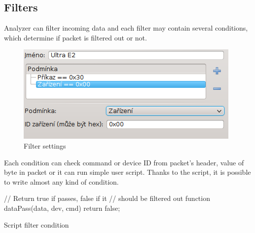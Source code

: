 \documentclass[12pt, a4paper, oneside]{article}
\begin{document}
\subsection{Filters}
Analyzer can filter incoming data and each filter may contain several conditions, which determine if packet is filtered out or not.
\begin{figure}[H]
\begin{center}
\includegraphics[scale=1]{img/filters.png}
\caption{Filter settings}
\end{center}
\end{figure}
Each condition can check command or device ID from packet's header, value of byte in packet or  it can run simple user script. Thanks to the script, it is possible to write almost any kind of condition.

\begin{listing}[H]
\begin{jscode}
// Return true if passes, false if it
// should be filtered out
function dataPass(data, dev, cmd) {
    return false;
}
\end{jscode}
\caption{Script filter condition}
\end{listing}

\end{document}
